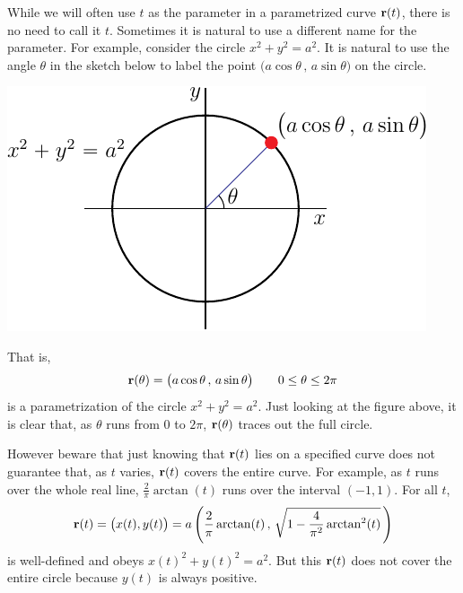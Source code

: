 \begin{eg}\label{eg:paramCircle}
While we will often use $t$ as the parameter in a parametrized curve $\mathbf{r}(t)$,
there is no need to call it $t$. Sometimes it is natural to use a different 
name for the parameter. For example, consider the circle $x^2+y^2=a^2$.
It is natural to use the angle $\theta$ in the sketch below to label
the point $\big(a\cos\theta\,,\,a\sin\theta\big)$ on the circle. 
\begin{efig}
\begin{center}
     \includegraphics{parCircle.pdf}
\end{center}
\end{efig}
That is,
\begin{equation*}
\mathbf{r}(\theta) = \big(a\cos\theta\,,\,a\sin\theta\big)\qquad
0\le \theta\le 2\pi
\end{equation*}
is a parametrization of the circle $x^2+y^2=a^2$. Just looking at the figure above, it is clear that, as $\theta$ runs from $0$ to $2\pi$, $\mathbf{r}(\theta)$
traces out the full circle. 

However beware that just knowing that 
$\mathbf{r}(t)$ lies on a specified curve does not guarantee that, as $t$ varies,
$\mathbf{r}(t)$ covers the entire curve. For example, as $t$ runs over the whole
real line, $\frac{2}{\pi}\arctan(t)$ runs over the interval $(-1,1)$.
For all $t$,
\begin{equation*}
\mathbf{r}(t) = \big(x(t),y(t)\big) 
       = a\left(\frac{2}{\pi}\arctan(t)\,,\,
                \sqrt{1-\frac{4}{\pi^2}\arctan^2(t)}\,\right)
\end{equation*}
is well-defined and obeys $x(t)^2+y(t)^2=a^2$. But this $\mathbf{r}(t)$ does not
cover the entire circle because $y(t)$ is always positive.

\end{eg}

